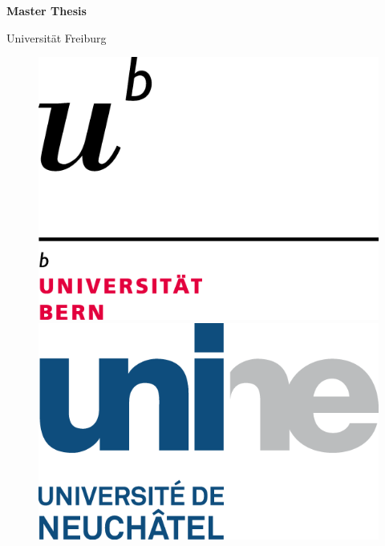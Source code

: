 {\begin{titlepage}
\begin{center}
    \vspace{0.3in} 
    \LARGE{\textbf{Master Thesis} \\}
    \vspace{0.4in}

    {\Large \thesisauthor}
    
    \vspace{0.3in}
    {\Large Universität Freiburg \par}
    \vfill
    {\Large \thesisdate \par}
  

  \vspace{0.9in}
 
  \begin{figure}[htp]
    \centering
    \includegraphics[scale=0.30]{logos/UNI_Bern.png}\hfill
    \includegraphics[scale=0.30]{logos/UNI_Neuenburg.png}\hfill

\end{figure}
\end{center}
\end{titlepage}}
